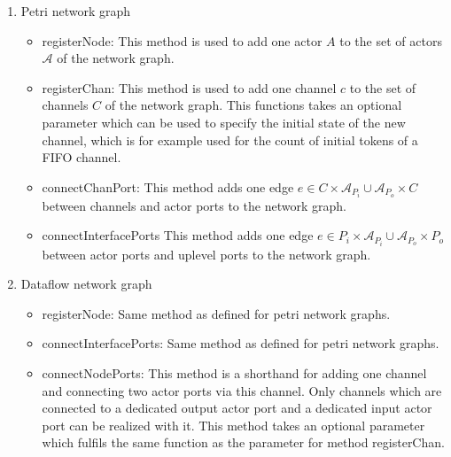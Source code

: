 \begin{enumerate}
\item Petri network graph

  \begin{itemize}
  \item registerNode:
    This method is used to add one actor $A$ to the set of actors $\mathcal{A}$
    of the network graph.

  \item registerChan:
    This method is used to add one channel $c$ to the set of channels $C$
    of the network graph. This functions takes an optional parameter which can
    be used to specify the initial state of the new channel, which is
    for example used for the count of initial tokens of a FIFO channel.

  \item connectChanPort:
    This method adds one edge $e \in C \times \mathcal{A}_{P_{i}} \cup \mathcal{A}_{P_{o}} \times C$
    between channels and actor ports to the network graph.

  \item connectInterfacePorts
    This method adds one edge $e \in P_{i} \times \mathcal{A}_{P_{i}} \cup \mathcal{A}_{P_{o}} \times P_{o}$
    between actor ports and uplevel ports to the network graph.

  \end{itemize}

\item Dataflow network graph

  \begin{itemize}
  \item registerNode: Same method as defined for petri network graphs.
  
  \item connectInterfacePorts: Same method as defined for petri network graphs.
  
  \item connectNodePorts:
    This method is a shorthand for adding one channel and
    connecting two actor ports via this channel. Only channels
    which are connected to a dedicated output actor port and
    a dedicated input actor port can be realized with it.
    This method takes an optional parameter which fulfils
    the same function as the parameter for method registerChan.
  
  \end{itemize}

\end{enumerate}

